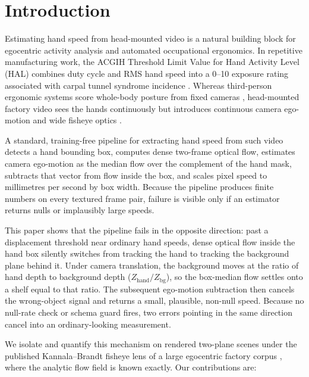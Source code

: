 \documentclass[11pt]{article}
\begin{document}
\section{Introduction}
\label{sec:intro}

Estimating hand speed from head-mounted video is a natural building block for egocentric activity
analysis and automated occupational ergonomics. In repetitive manufacturing work, the ACGIH
Threshold Limit Value for Hand Activity Level (HAL) combines duty cycle and RMS hand speed into a
0--10 exposure rating associated with carpal tunnel syndrome incidence
\citep{latko1997,kapellusch2014,radwin2015,akkas2015}. Whereas third-person ergonomic systems
score whole-body posture from fixed cameras \citep{chen2013,agostinelli2024}, head-mounted
factory video sees the hands continuously but introduces continuous camera ego-motion and wide
fisheye optics \citep{grauman2022ego4d,damen2022epic100,buildai2025corpus}.

A standard, training-free pipeline for extracting hand speed from such video detects a hand
bounding box, computes dense two-frame optical flow, estimates camera ego-motion as the median
flow over the complement of the hand mask, subtracts that vector from flow inside the box, and
scales pixel speed to millimetres per second by box width. Because the pipeline produces finite
numbers on every textured frame pair, failure is visible only if an estimator returns nulls or
implausibly large speeds.

This paper shows that the pipeline fails in the opposite direction: past a displacement threshold
near ordinary hand speeds, dense optical flow inside the hand box silently switches from tracking
the hand to tracking the background plane behind it. Under camera translation, the background
moves at the ratio of hand depth to background depth ($Z_{\mathrm{hand}}/Z_{\mathrm{bg}}$), so
the box-median flow settles onto a shelf equal to that ratio. The subsequent ego-motion
subtraction then cancels the wrong-object signal and returns a small, plausible, non-null speed.
Because no null-rate check or schema guard fires, two errors pointing in the same direction cancel
into an ordinary-looking measurement.

We isolate and quantify this mechanism on rendered two-plane scenes under the published
Kannala--Brandt fisheye lens of a large egocentric factory corpus \citep{kannala2006,buildai2025corpus},
where the analytic flow field is known exactly. Our contributions are:
\end{document}
